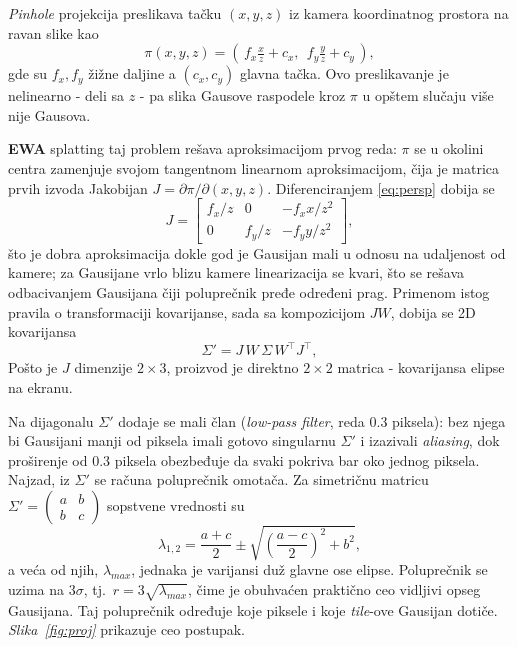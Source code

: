 \documentclass[12pt]{article}
\begin{document}
   \textit{Pinhole} projekcija preslikava tačku $(x, y, z)$ iz kamera koordinatnog prostora na ravan
   slike kao
   \begin{equation}\label{eq:persp}
      \pi(x, y, z) = \left(\, f_x \tfrac{x}{z} + c_x,\ \ f_y \tfrac{y}{z} + c_y \,\right),
   \end{equation}
   gde su $f_x, f_y$ žižne daljine a $(c_x, c_y)$ glavna tačka. Ovo preslikavanje je
   nelinearno - deli sa $z$ - pa slika Gausove raspodele kroz $\pi$ u opštem slučaju
   više nije Gausova.

   \textbf{EWA} splatting \cite{ewa_splatting} taj problem rešava aproksimacijom
   prvog reda: $\pi$ se u okolini centra zamenjuje svojom tangentnom linearnom
   aproksimacijom, čija je matrica prvih izvoda Jakobijan $J = \partial \pi / \partial (x,y,z)$.
   Diferenciranjem \eqref{eq:persp} dobija se
   \begin{equation}\label{eq:jac}
      J = \begin{bmatrix}
         f_x/z & 0 & -f_x x / z^2 \\
         0 & f_y/z & -f_y y / z^2
      \end{bmatrix},
   \end{equation}
   što je dobra aproksimacija dokle god je Gausijan mali u odnosu na udaljenost od
   kamere; za Gausijane vrlo blizu kamere linearizacija se kvari, što se rešava
   odbacivanjem Gausijana čiji poluprečnik pređe određeni prag. Primenom istog pravila o transformaciji
   kovarijanse, sada sa kompozicijom $JW$, dobija se 2D kovarijansa
   \begin{equation}\label{eq:sigma2d}
      \Sigma' = J\,W\,\Sigma\,W^\top J^\top,
   \end{equation}
   Pošto je $J$ dimenzije $2\times3$, proizvod je direktno $2\times2$ matrica -
   kovarijansa elipse na ekranu.

   Na dijagonalu $\Sigma'$ dodaje se mali član (\textit{low-pass filter}, reda
   $0.3$ piksela): bez njega bi Gausijani manji od piksela imali gotovo
   singularnu $\Sigma'$ i izazivali \textit{aliasing}, dok proširenje od $0.3$ piksela obezbeđuje da svaki pokriva
   bar oko jednog piksela. Najzad, iz $\Sigma'$ se računa poluprečnik omotača. Za
   simetričnu matricu $\Sigma' = \left(\begin{smallmatrix} a & b \\ b & c \end{smallmatrix}\right)$
   sopstvene vrednosti su
   \begin{equation}\label{eq:eig}
      \lambda_{1,2} = \frac{a+c}{2} \pm \sqrt{\left(\frac{a-c}{2}\right)^2 + b^2},
   \end{equation}
   a veća od njih, $\lambda_{max}$, jednaka je varijansi duž glavne ose elipse.
   Poluprečnik se uzima na $3\sigma$, tj.\ $r = 3\sqrt{\lambda_{max}}$, čime je
   obuhvaćen praktično ceo vidljivi opseg Gausijana. Taj poluprečnik određuje koje
   piksele i koje \textit{tile}-ove Gausijan dotiče.
   \textit{Slika~\ref{fig:proj}} prikazuje ceo postupak.
\end{document}
